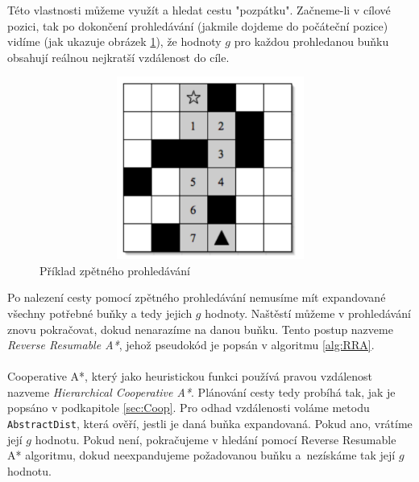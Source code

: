 Této vlastnosti můžeme využít a hledat cestu "pozpátku". Začneme-li v cílové pozici, tak po dokončení prohledávání (jakmile dojdeme do počáteční pozice) vidíme (jak ukazuje obrázek \ref{obr:backwardsSearch}), že hodnoty $g$ pro každou prohledanou buňku obsahují reálnou nejkratší vzdálenost do cíle.

\begin{figure}[htb]
	\begin{center}
		\includegraphics*[width=15cm,height=6cm,keepaspectratio]{obr/backwardsSearch}
	\end{center}
	\caption[caption]{Příklad zpětného prohledávání \cite{Silver2006}}
	\label{obr:backwardsSearch}
\end{figure}

Po nalezení cesty pomocí zpětného prohledávání nemusíme mít expandované všechny potřebné buňky a tedy jejich $g$ hodnoty. Naštěstí můžeme v prohledávání znovu pokračovat, dokud nenarazíme na danou buňku. Tento postup nazveme \emph{Reverse Resumable A*}, jehož pseudokód je popsán v algoritmu \ref{alg:RRA}.
\\
\\ %
Cooperative A*, který jako heuristickou funkci používá pravou vzdálenost nazveme \emph{Hierarchical Cooperative A*}. Plánování cesty tedy probíhá tak, jak je popsáno v podkapitole \ref{sec:Coop}. Pro odhad vzdálenosti voláme metodu \texttt{AbstractDist}, která ověří, jestli je daná buňka expandovaná. Pokud ano, vrátíme její $g$ hodnotu. Pokud není, pokračujeme v hledání pomocí Reverse Resumable A* algoritmu, dokud neexpandujeme požadovanou buňku a~nezískáme tak její $g$ hodnotu.

